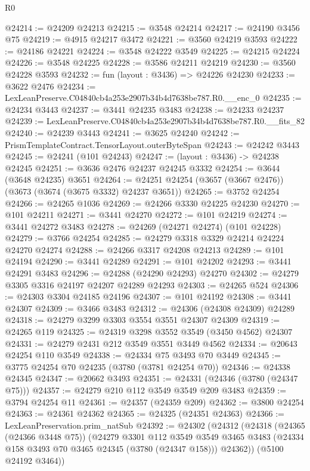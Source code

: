 \begin{lexlean}{R0}
\begin{coremodule}
@24214 := @24209 @24213
@24215 := @3548 @24214
@24217 := @24190 @3456 @75
@24219 := @4915 @24217 @3472
@24221 := @3560 @24219 @3593
@24222 := @24186 @24221
@24224 := @3548 @24222 @3549
@24225 := @24215 @24224
@24226 := @3548 @24225
@24228 := @3586 @24211 @24219
@24230 := @3560 @24228 @3593
@24232 := fun (layout : @3436) => @24226 @24230
@24233 := @3622 @2476
@24234 := LexLeanPreserve.C04840cb4a253e2907b34b4d7638be787.R0.__enc_0
@24235 := @24234 @3443
@24237 := @3441 @24235 @3483
@24238 := @24233 @24237
@24239 := LexLeanPreserve.C04840cb4a253e2907b34b4d7638be787.R0.__fits_82
@24240 := @24239 @3443
@24241 := @3625 @24240
@24242 := PrismTemplateContract.TensorLayout.outerByteSpan
@24243 := @24242 @3443
@24245 := @24241 (@101 @24243)
@24247 := (layout : @3436) -> @24238 @24245
@24251 := @3636 @2476 @24237 @24245 @3332
@24254 := @3644 (@3648 @24235) @3651
@24264 := @24251 @24254 (@3657 (@3667 @2476)) (@3673 (@3674 (@3675 @3332) @24237 @3651))
@24265 := @3752 @24254
@24266 := @24265 @1036
@24269 := @24266 @3330 @24225 @24230
@24270 := @101 @24211
@24271 := @3441 @24270
@24272 := @101 @24219
@24274 := @3441 @24272 @3483
@24278 := @24269 (@24271 @24274) (@101 @24228)
@24279 := @3766 @24254
@24285 := @24279 @3318 @3329 @24214 @24224 @24270 @24274
@24288 := @24266 @3317 @24208 @24213
@24289 := @101 @24194
@24290 := @3441 @24289
@24291 := @101 @24202
@24293 := @3441 @24291 @3483
@24296 := @24288 (@24290 @24293) @24270
@24302 := @24279 @3305 @3316 @24197 @24207 @24289 @24293
@24303 := @24265 @524
@24306 := @24303 @3304 @24185 @24196
@24307 := @101 @24192
@24308 := @3441 @24307
@24309 := @3466 @3483
@24312 := @24306 (@24308 @24309) @24289
@24318 := @24279 @3299 @3303 @3554 @3551 @24307 @24309
@24319 := @24265 @119
@24325 := @24319 @3298 @3552 @3549 (@3450 @4562) @24307
@24331 := @24279 @2431 @212 @3549 @3551 @3449 @4562
@24334 := @20643 @24254 @110 @3549
@24338 := @24334 @75 @3493 @70 @3449
@24345 := @3775 @24254 @70 @24235 (@3780 (@3781 @24254 @70))
@24346 := @24338 @24345
@24347 := @20662 @3493
@24351 := @24331 (@24346 (@3780 (@24347 @75)))
@24357 := @24279 @210 @112 @3549 @3549 @209 @3483
@24359 := @3794 @24254 @11
@24361 := @24357 (@24359 @209)
@24362 := @3800 @24254
@24363 := @24361 @24362
@24365 := @24325 (@24351 @24363)
@24366 := LexLeanPreservation.prim_natSub
@24392 := @24302
    (@24312
      (@24318
        (@24365 (@24366 @3448 @75))
        (@24279
          @3301
          @112
          @3549
          @3549
          @3465
          @3483
          (@24334 @158 @3493 @70 @3465 @24345 (@3780 (@24347 @158)))
          @24362))
      (@5100 @24192 @3464))

\end{coremodule}
\end{lexlean}
